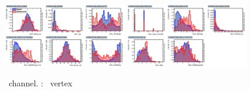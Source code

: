 \begin{figure}[htbp]
	\includegraphics[width=0.48\textwidth]{6_Search/Figures/MVAtechnics/toppairzut/eee/variables_id_c1.png}
	\includegraphics[width=0.48\textwidth]{6_Search/Figures/MVAtechnics/toppairzut/eee/variables_id_c2.png}
	\caption{\eee\ channel. \TTSR: \Zut\ vertex }
	\label{image:Figureseeetoppairzut}
\end{figure}

